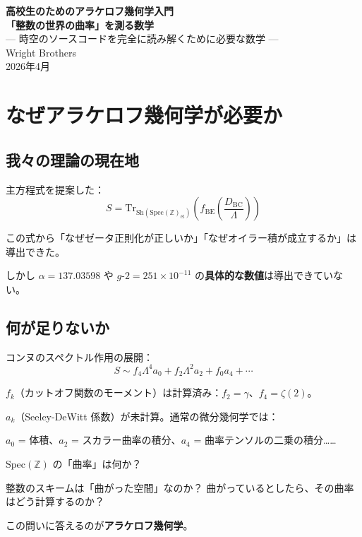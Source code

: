 \documentclass[12pt,a4paper]{article}
\newcommand{\Spec}{\mathrm{Spec}}
\begin{document}
\begin{center}
{\LARGE\bfseries 高校生のためのアラケロフ幾何学入門}\\[0.5cm]
{\Large\bfseries 「整数の世界の曲率」を測る数学}\\[0.3cm]
{\large --- 時空のソースコードを完全に読み解くために必要な数学 ---}\\[1.5cm]
{\large Wright Brothers}\\[0.3cm]
{2026年4月}
\end{center}

\vspace{0.5cm}
\tableofcontents
\newpage

\section{なぜアラケロフ幾何学が必要か}

\subsection{我々の理論の現在地}

主方程式を提案した：
$$S = \mathrm{Tr}_{\mathrm{Sh}(\Spec(\mathbb{Z})_{\text{ét}})} \left( f_{\mathrm{BE}} \left( \frac{D_{\mathrm{BC}}}{\Lambda} \right) \right)$$

この式から「なぜゼータ正則化が正しいか」「なぜオイラー積が成立するか」は導出できた。

しかし $\alpha = 137.03598$ や $g\text{-}2 = 251 \times 10^{-11}$ の\textbf{具体的な数値}は導出できていない。

\subsection{何が足りないか}

コンヌのスペクトル作用の展開：
$$S \sim f_4\Lambda^4 a_0 + f_2\Lambda^2 a_2 + f_0 a_4 + \cdots$$

$f_k$（カットオフ関数のモーメント）は計算済み：$f_2 = \gamma$、$f_4 = \zeta(2)$。

$a_k$（Seeley-DeWitt 係数）が未計算。通常の微分幾何学では：

$a_0$ = 体積、$a_2$ = スカラー曲率の積分、$a_4$ = 曲率テンソルの二乗の積分……

\begin{storybox}[問題]
$\Spec(\mathbb{Z})$ の「曲率」は何か？

整数のスキームは「曲がった空間」なのか？ 曲がっているとしたら、その曲率はどう計算するのか？

この問いに答えるのが\textbf{アラケロフ幾何学}。
\end{storybox}
\end{document}
